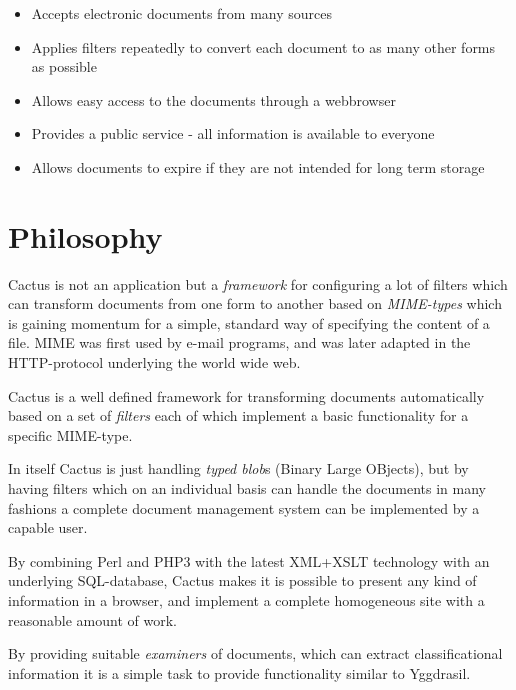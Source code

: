 \begin{itemize}
  
\item Accepts electronic documents from many sources
  
\item Applies filters repeatedly to convert each document to as many
  other forms as possible
  
\item Allows easy access to the documents through a webbrowser
  
\item Provides a public service - all information is available to
  everyone
  
\item Allows documents to expire if they are not intended for long
  term storage

\end{itemize}



\section{Philosophy}
\label{sec:cactus-philosophy}

Cactus is not an application but a \textit{framework} for configuring
a lot of filters which can transform documents from one form to
another based on \textit{MIME-types} which is gaining momentum for a
simple, standard way of specifying the content of a file.  MIME was
first used by e-mail programs, and was later adapted in the
HTTP-protocol underlying the world wide web.

Cactus is a well defined framework for transforming documents
automatically based on a set of \textit{filters} each of which
implement a basic functionality for a specific MIME-type.

In itself Cactus is just handling \textit{typed blob}s (Binary Large
OBjects), but by having filters which on an individual basis can
handle the documents in many fashions a complete document management
system can be implemented by a capable user.

By combining Perl and PHP3 with the latest XML+XSLT technology with an
underlying SQL-database, Cactus makes it is possible to present any
kind of information in a browser, and implement a complete homogeneous
site with a reasonable amount of work.

By providing suitable \textit{examiners} of documents, which can
extract classificational information it is a simple task to provide
functionality similar to Yggdrasil.  


